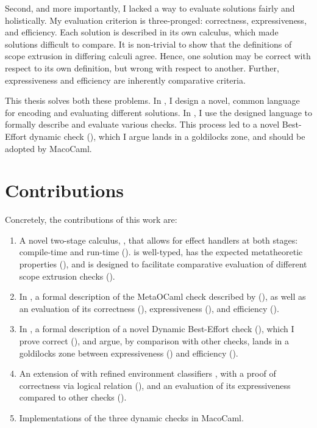 Second, and more importantly, I lacked a way to evaluate solutions fairly and holistically. My evaluation criterion is three-pronged: correctness, expressiveness, and efficiency. Each solution is described in its own calculus, which made solutions difficult to compare. It is non-trivial to show that the definitions of scope extrusion in differing calculi agree. Hence, one solution may be correct with respect to its own definition, but wrong with respect to another. Further, expressiveness and efficiency are inherently comparative criteria.

This thesis solves both these problems. In , I design a novel, common language for encoding and evaluating different solutions. In , I use the designed language to formally describe and evaluate various checks. This process led to a novel Best-Effort dynamic check (), which I argue lands in a goldilocks zone, and should be adopted by MacoCaml.

\section{Contributions}

Concretely, the contributions of this work are:
\begin{enumerate}
    \item A novel two-stage calculus, \calculusName{}, that allows for effect handlers at both stages: compile-time and run-time (). \calculusName{} is well-typed, has the expected metatheoretic properties (), and is designed to facilitate comparative evaluation of different scope extrusion checks ().
    \item In \calculusName{}, a formal description of the MetaOCaml check described by \citet{kiselyov-14} (), as well as an evaluation of its correctness (), expressiveness (), and efficiency ().
    \item In \calculusName{}, a formal description of a novel Dynamic Best-Effort check (), which I prove correct (), and argue, by comparison with other checks, lands in a goldilocks zone between expressiveness () and efficiency (). 
    \item An extension of \calculusName{} with refined environment classifiers \citep{kiselyov-16}, with a proof of correctness via logical relation (), and an evaluation of its expressiveness compared to other checks ().
    \item Implementations of the three dynamic checks in MacoCaml.
\end{enumerate}

